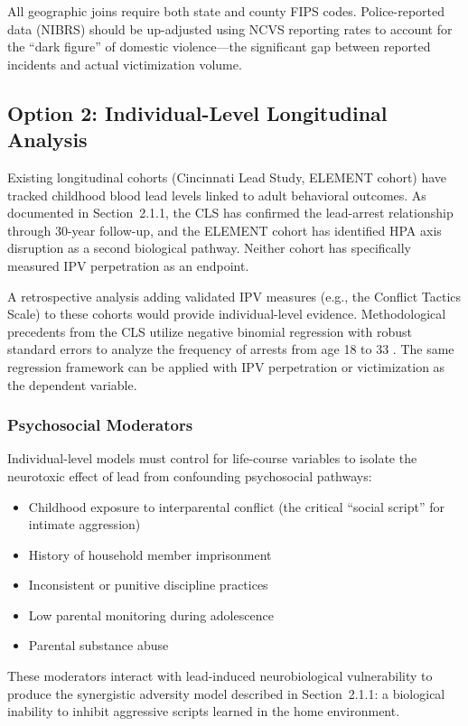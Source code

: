 \documentclass[12pt, letterpaper]{article}
\begin{document}
\noindent All geographic joins require both state and county FIPS codes. Police-reported data (NIBRS) should be up-adjusted using NCVS reporting rates to account for the ``dark figure'' of domestic violence---the significant gap between reported incidents and actual victimization volume.

\subsection{Option 2: Individual-Level Longitudinal Analysis}

Existing longitudinal cohorts (Cincinnati Lead Study, ELEMENT cohort) have tracked childhood blood lead levels linked to adult behavioral outcomes. As documented in Section~2.1.1, the CLS has confirmed the lead-arrest relationship through 30-year follow-up, and the ELEMENT cohort has identified HPA axis disruption as a second biological pathway. Neither cohort has specifically measured IPV perpetration as an endpoint.

A retrospective analysis adding validated IPV measures (e.g., the Conflict Tactics Scale) to these cohorts would provide individual-level evidence. Methodological precedents from the CLS utilize negative binomial regression with robust standard errors to analyze the frequency of arrests from age 18 to 33 \citep{wright2008}. The same regression framework can be applied with IPV perpetration or victimization as the dependent variable.

\subsubsection{Psychosocial Moderators}

Individual-level models must control for life-course variables to isolate the neurotoxic effect of lead from confounding psychosocial pathways:
\begin{itemize}[nosep]
    \item Childhood exposure to interparental conflict (the critical ``social script'' for intimate aggression)
    \item History of household member imprisonment
    \item Inconsistent or punitive discipline practices
    \item Low parental monitoring during adolescence
    \item Parental substance abuse
\end{itemize}

\noindent These moderators interact with lead-induced neurobiological vulnerability to produce the synergistic adversity model described in Section~2.1.1: a biological inability to inhibit aggressive scripts learned in the home environment.
\end{document}
